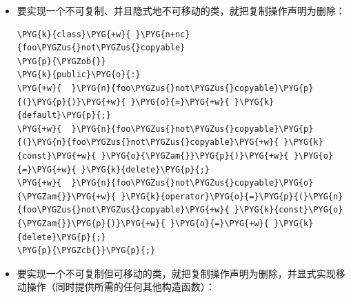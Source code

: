 \begin{itemize}
\item 要实现一个不可复制、并且隐式地不可移动的类，就把复制操作声明为删除：



\begin{codeblockbg}
\begin{Verbatim}[commandchars=\\\{\},breaklines=true,breakanywhere=true,fontsize=\codefont,xleftmargin=17bp]
\PYG{k}{class}\PYG{+w}{ }\PYG{n+nc}{foo\PYGZus{}not\PYGZus{}copyable}
\PYG{p}{\PYGZob{}}
\PYG{k}{public}\PYG{o}{:}
\PYG{+w}{  }\PYG{n}{foo\PYGZus{}not\PYGZus{}copyable}\PYG{p}{(}\PYG{p}{)}\PYG{+w}{ }\PYG{o}{=}\PYG{+w}{ }\PYG{k}{default}\PYG{p}{;}
\PYG{+w}{  }\PYG{n}{foo\PYGZus{}not\PYGZus{}copyable}\PYG{p}{(}\PYG{n}{foo\PYGZus{}not\PYGZus{}copyable}\PYG{+w}{ }\PYG{k}{const}\PYG{+w}{ }\PYG{o}{\PYGZam{}}\PYG{p}{)}\PYG{+w}{ }\PYG{o}{=}\PYG{+w}{ }\PYG{k}{delete}\PYG{p}{;}
\PYG{+w}{  }\PYG{n}{foo\PYGZus{}not\PYGZus{}copyable}\PYG{o}{\PYGZam{}}\PYG{+w}{ }\PYG{k}{operator}\PYG{o}{=}\PYG{p}{(}\PYG{n}{foo\PYGZus{}not\PYGZus{}copyable}\PYG{+w}{ }\PYG{k}{const}\PYG{o}{\PYGZam{}}\PYG{p}{)}\PYG{+w}{ }\PYG{o}{=}\PYG{+w}{ }\PYG{k}{delete}\PYG{p}{;}
\PYG{p}{\PYGZcb{}}\PYG{p}{;}
\end{Verbatim}
\end{codeblockbg}



\item 要实现一个不可复制但可移动的类，就把复制操作声明为删除，并显式实现移动操作（同时提供所需的任何其他构造函数）：




\end{itemize}
